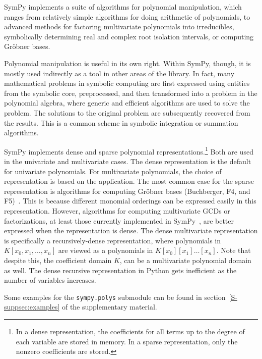 
SymPy implements a suite of algorithms for polynomial manipulation,
which ranges from relatively simple algorithms for doing arithmetic of
polynomials, to advanced methods for factoring multivariate polynomials
into irreducibles, symbolically determining real and complex root isolation
intervals, or computing Gr\"{o}bner bases.

Polynomial manipulation is useful in its own right. Within SymPy, though, it is mostly used
indirectly as a tool in other areas of the library. In fact, many mathematical
problems in symbolic computing are first expressed using entities from the
symbolic core, preprocessed, and then transformed into a problem in the
polynomial algebra, where generic and efficient algorithms are used to solve
the problem.  The solutions to the original problem are subsequently recovered from the results.
This is a common scheme in symbolic integration or summation algorithms.

SymPy implements dense and sparse polynomial representations.\footnote{In a
dense representation, the coefficients for all terms up to the degree of each
variable are stored in memory. In a sparse representation, only the nonzero
coefficients are stored.} Both are used in the univariate and multivariate
cases. The dense representation is the default for univariate polynomials. For
multivariate polynomials, the choice of representation is based on the
application. The most common case for the sparse representation is algorithms
for computing Gr\"{o}bner bases (Buchberger, F4, and
F5)~\cite{Buchberger1965thesis,Faugere1999f4,Faugere2002f5}. This is because
different monomial orderings can be expressed easily in this representation.
However, algorithms for computing multivariate GCDs or factorizations, at
least those currently implemented in SymPy~\cite{paprocki2010thesis},
are better expressed when the representation is dense. The dense multivariate
representation is specifically a recursively-dense representation, where
polynomials in $K[x_0, x_1, \dotsc, x_n]$ are viewed as a polynomials in
$K[x_0][x_1]\dotso[x_n]$. Note that despite this, the coefficient domain $K$,
can be a multivariate polynomial domain as well. The dense recursive
representation in Python gets inefficient as the number of variables increases.

Some examples for the \texttt{sympy.polys} submodule can be found in
section~\ref{S-suppsec:examples} of the supplementary material.
